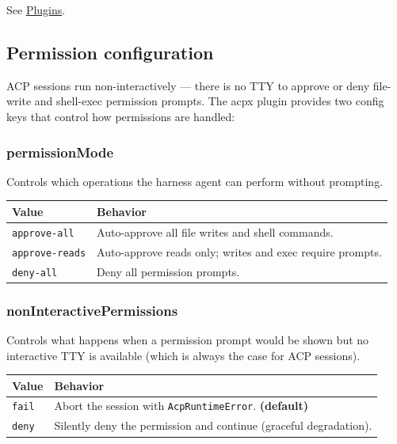 See \href{/tools/plugin}{Plugins}.

\subsection{Permission configuration}


ACP sessions run non-interactively — there is no TTY to approve or deny file-write and shell-exec permission prompts. The acpx plugin provides two config keys that control how permissions are handled:

\subsubsection{permissionMode}


Controls which operations the harness agent can perform without prompting.


\begin{table}[h]
\centering
\small
\begin{tabular}{|l|l|}
\hline
Value & Behavior \\
\hline
\texttt{approve-all} & Auto-approve all file writes and shell commands. \\
\hline
\texttt{approve-reads} & Auto-approve reads only; writes and exec require prompts. \\
\hline
\texttt{deny-all} & Deny all permission prompts. \\
\hline
\end{tabular}
\end{table}



\subsubsection{nonInteractivePermissions}


Controls what happens when a permission prompt would be shown but no interactive TTY is available (which is always the case for ACP sessions).


\begin{table}[h]
\centering
\small
\begin{tabular}{|l|l|}
\hline
Value & Behavior \\
\hline
\texttt{fail} & Abort the session with \texttt{AcpRuntimeError}. \textbf{(default)} \\
\hline
\texttt{deny} & Silently deny the permission and continue (graceful degradation). \\
\hline
\end{tabular}
\end{table}




